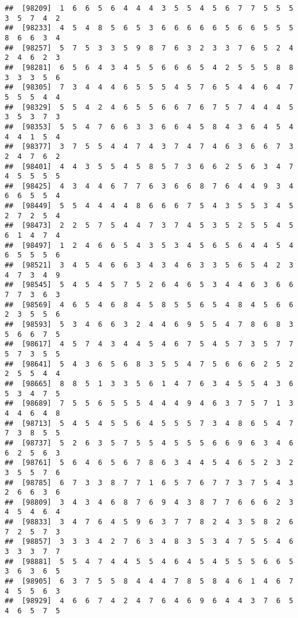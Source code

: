 \documentclass[
]{book}
\begin{document}
\begin{verbatim}
##  [98209]  1  6  6  5  6  4  4  4  3  5  5  4  5  6  7  7  5  5  5  3  5  7  4  2
##  [98233]  4  5  4  8  5  6  5  3  6  6  6  6  6  5  6  6  5  5  5  8  6  6  3  4
##  [98257]  5  7  5  3  3  5  9  8  7  6  3  2  3  3  7  6  5  2  4  2  4  6  2  3
##  [98281]  6  5  6  4  3  4  5  5  6  6  6  5  4  2  5  5  5  8  8  3  3  3  5  6
##  [98305]  7  3  4  4  4  6  5  5  5  4  5  7  6  5  4  4  6  4  7  5  5  5  4  4
##  [98329]  5  5  4  2  4  6  5  5  6  6  7  6  7  5  7  4  4  4  5  3  5  3  7  3
##  [98353]  5  5  4  7  6  6  3  3  6  6  4  5  8  4  3  6  4  5  4  4  4  1  5  4
##  [98377]  3  7  5  5  4  4  7  4  3  7  4  7  4  6  3  6  6  7  3  2  4  7  6  2
##  [98401]  4  4  3  5  5  4  5  8  5  7  3  6  6  2  5  6  3  4  7  4  5  5  5  5
##  [98425]  4  3  4  4  6  7  7  6  3  6  6  8  7  6  4  4  9  3  4  6  6  5  5  4
##  [98449]  5  5  4  4  4  4  8  6  6  6  7  5  4  3  5  5  3  4  5  2  7  2  5  4
##  [98473]  2  2  5  7  5  4  4  7  3  7  4  5  3  5  2  5  5  4  5  6  1  4  7  4
##  [98497]  1  2  4  6  6  5  4  3  5  3  4  5  6  5  6  4  4  5  4  6  5  5  5  6
##  [98521]  3  4  5  4  6  6  3  4  3  4  6  3  3  5  6  5  4  2  3  4  7  3  4  9
##  [98545]  5  4  5  4  5  7  5  2  6  4  6  5  3  4  4  6  3  6  6  7  7  3  6  3
##  [98569]  4  6  5  4  6  8  4  5  8  5  5  6  5  4  8  4  5  6  6  2  3  5  5  6
##  [98593]  5  3  4  6  6  3  2  4  4  6  9  5  5  4  7  8  6  8  3  5  6  6  7  5
##  [98617]  4  5  7  4  3  4  4  5  4  6  7  5  4  5  7  3  5  7  7  5  7  3  5  5
##  [98641]  5  4  3  6  5  6  8  3  5  5  4  7  5  6  6  6  2  5  2  2  5  5  4  4
##  [98665]  8  8  5  1  3  3  5  6  1  4  7  6  3  4  5  5  4  3  6  5  3  4  7  5
##  [98689]  7  5  5  6  5  5  5  4  4  4  9  4  6  3  7  5  7  1  3  4  4  6  4  8
##  [98713]  5  4  5  4  5  5  6  4  5  5  5  7  3  4  8  6  5  4  7  7  3  8  5  5
##  [98737]  5  2  6  3  5  7  5  5  4  5  5  5  6  6  9  6  3  4  6  6  2  5  6  3
##  [98761]  5  6  4  6  5  6  7  8  6  3  4  4  5  4  6  5  2  3  2  3  5  5  7  6
##  [98785]  6  7  3  3  8  7  7  1  6  5  7  6  7  7  3  7  5  4  3  2  6  6  3  6
##  [98809]  3  4  3  4  6  8  7  6  9  4  3  8  7  7  6  6  6  2  3  4  5  4  6  4
##  [98833]  3  4  7  6  4  5  9  6  3  7  7  8  2  4  3  5  8  2  6  7  2  5  7  3
##  [98857]  3  3  3  4  2  7  6  3  4  8  3  5  3  4  7  5  5  4  6  3  3  3  7  7
##  [98881]  5  5  4  7  4  4  5  5  4  6  4  5  4  5  5  5  6  6  5  3  6  3  6  5
##  [98905]  6  3  7  5  5  8  4  4  4  7  8  5  8  4  6  1  4  6  7  4  5  5  6  3
##  [98929]  4  6  6  7  4  2  4  7  6  4  6  9  6  4  4  3  7  6  5  4  6  5  7  5

\end{verbatim}
\end{document}
